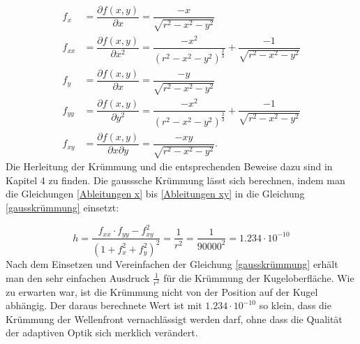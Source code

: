 \begin{refsection}
\begin{align}
f_{x}&=\dfrac{\partial f(x,y)}{\partial x}= \dfrac{-x}{\sqrt{r^{2}-x^{2}-y^{2}}}
\label{Ableitungen x}
\\
f_{xx}&=\dfrac{\partial f(x,y)}{\partial x^{2}}= \dfrac{- x^2}{(r^2 - x^2 - y^2)^{\frac{2}{3}}}+\dfrac{ - 1}{\sqrt{r^2 - x^2 - y^2}}
\label{Ableitungen xx}
\\
f_{y}&=\dfrac{\partial f(x,y)}{\partial x}= \dfrac{-y}{\sqrt{r^{2}-x^{2}-y^{2}}}
\label{Ableitungen y}
\\
f_{yy}&=\dfrac{\partial f(x,y)}{\partial y^{2}}= \dfrac{- x^2}{(r^2 - x^2 - y^2)^{\frac{2}{3}}}+\dfrac{ - 1}{\sqrt{r^2 - x^2 - y^2}}
\label{Ableitungen yy}
\\
f_{xy}&=\dfrac{\partial f(x,y)}{\partial x \partial y}=  \dfrac{-xy}{\sqrt{r^{2}-x^{2}-y^{2}}}.
\label{Ableitungen xy}
\end{align}
Die Herleitung der Krümmung und die entsprechenden Beweise dazu sind in Kapitel 4 zu finden. Die gausssche Krümmung lässt sich berechnen, indem man die Gleichungen \eqref{Ableitungen x} bis \eqref{Ableitungen xy} in die Gleichung \eqref{gausskrümmung} einsetzt:  

\begin{equation}\label{gausskrümmung}
h = \dfrac{f_{xx} \cdot f_{yy} -f_{xy}^{2}}{(1+f_{x}^{2}+f_{y}^{2})^{2}} = \dfrac{1}{r^{2}} =\dfrac{1}{90000^{2}} = 1.234\cdot 10^{-10}
\end{equation}
Nach dem Einsetzen und Vereinfachen der Gleichung \eqref{gausskrümmung}
erhält man den sehr einfachen Ausdruck $\frac{1}{r^{2}}$ für die
Krümmung der Kugeloberfläche. Wie zu erwarten war, ist die Krümmung
nicht von der Position auf der Kugel abhängig.
Der daraus berechnete Wert ist mit $1.234\cdot 10^{-10}$ so klein,
dass die Krümmung der Wellenfront vernachlässigt werden darf, ohne
dass die Qualität der adaptiven Optik sich merklich verändert.


\end{refsection}

